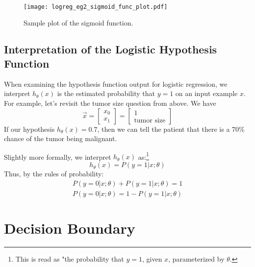 \begin{figure}[h] %
	\centering
	\graphicspath{{./Figures/}} %
	\texttt{[image: logreg\_eg2\_sigmoid\_func\_plot.pdf]} 
	\caption[]{Sample plot of the sigmoid function.}
	\label{logreg_eg2_sigmoid_func_plot.pdf}
\end{figure}


\subsection{Interpretation of the Logistic Hypothesis Function}

When examining the hypothesis function output for logistic regression, we interpret $h_\theta\left(x \right)$ is the estimated probability that $y=1$ on an input example $x$. For example, let's revisit the tumor size question from above. We have 
$$
\vec{x} = \left[\begin{array}{c}x_0 \\ x_1 \end{array}\right] = \left[\begin{array}{c}1 \\ \text{tumor size} \end{array}\right]
$$
If our hypothesis $h_\theta\left( x \right) = 0.7$, then we can tell the patient that there is a 70\% chance of the tumor being malignant. 

Slightly more formally, we interpret $h_\theta\left(x\right)$ as:\footnote{This is read as "the probability that $y = 1$, given $x$, parameterized by $\theta$.}
\begin{equation}
h_\theta\left(x\right) = P\left(y=1 | x; \theta\right)
\end{equation}
Thus, by the rules of probability:
\begin{align}
P\left(y=0 | x; \theta\right) + P\left(y=1 | x; \theta\right) = 1 \\
P\left(y=0 | x; \theta\right) = 1 - P\left(y=1 | x; \theta\right)
\end{align}

\section{Decision Boundary}








































